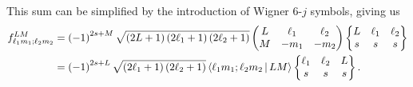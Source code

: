 \documentclass[notitlepage,twocolumn]{revtex4-2}
\newcommand{\p}[1]{\left(#1\right)} %
\newcommand{\bk}{\Braket} %
\begin{document}
This sum can be simplified by the introduction of Wigner 6-$j$ symbols, giving us
\begin{align}
  f_{\ell_1 m_1;\ell_2 m_2}^{LM}
  &= \p{-1}^{2s+M} \sqrt{\p{2L+1}\p{2\ell_1+1}\p{2\ell_2+1}}
  \begin{pmatrix}
    L & \ell_1 & \ell_2 \\
    M & -m_1 & -m_2
  \end{pmatrix}
  \begin{Bmatrix}
    L & \ell_1 & \ell_2 \\
    s & s & s
  \end{Bmatrix} \\
  &= \p{-1}^{2s+L} \sqrt{\p{2\ell_1+1}\p{2\ell_2+1}}
  \bk{\ell_1 m_1; \ell_2 m_2| LM}
  \begin{Bmatrix}
    \ell_1 & \ell_2 & L \\
    s & s & s
  \end{Bmatrix}.
\end{align}
\end{document}
